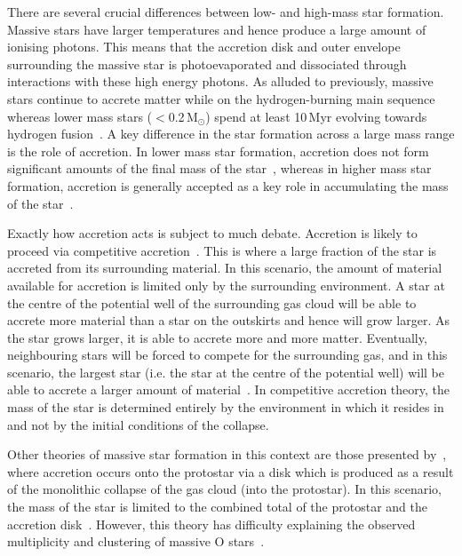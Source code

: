 There are several crucial differences between low- and high-mass star formation.\footnotemark~
Massive stars have larger temperatures and hence produce a large amount of ionising photons.
This means that the accretion disk and outer envelope surrounding the massive star is photoevaporated and dissociated through interactions with these high energy photons.
As alluded to previously, massive stars continue to accrete matter while on the hydrogen-burning main sequence~\citep{Zinnecker07}
whereas lower mass stars ($<$0.2\,M$_{\odot}$) spend at least 10\,Myr evolving towards hydrogen fusion~\citep{Luhman12}.
A key difference in the star formation across a large mass range is the role of accretion.
In lower mass star formation, accretion does not form significant amounts of the final mass of the star~\citep{Bonnell08}, whereas in higher mass star formation, accretion is generally accepted as a key role in accumulating the mass of the star~\citep{Kraus10}.


Exactly how accretion acts is subject to much debate.
Accretion is likely to proceed via competitive accretion~\citep{Bonnell01}.
This is where a large fraction of the star is accreted from its surrounding material.
In this scenario, the amount of material available for accretion is limited only by the surrounding environment.
A star at the centre of the potential well of the surrounding gas cloud will be able to accrete more material than a star on the outskirts and hence will grow larger.
As the star grows larger, it is able to accrete more and more matter.
Eventually, neighbouring stars will be forced to compete for the surrounding gas, and in this scenario, the largest star (i.e. the star at the centre of the potential well) will be able to accrete a larger amount of material~\citep[for a useful economical analogy -- the rich get richer --, see Section 4.2 of][]{Zinnecker07}.
In competitive accretion theory, the mass of the star is determined entirely by the environment in which it resides in and not by the initial conditions of the collapse.

Other theories of massive star formation in this context are those presented by~\cite{Yorke02}, where accretion occurs onto the protostar via a disk which is produced as a result of the monolithic collapse of the gas cloud (into the protostar).
In this scenario, the mass of the star is limited to the combined total of the protostar and the accretion disk~\citep{Zinnecker07}.
However, this theory has difficulty explaining the observed multiplicity and clustering of massive O stars~\citep{Zinnecker07, Sana12, 2012ARA&A..50..531K}.

